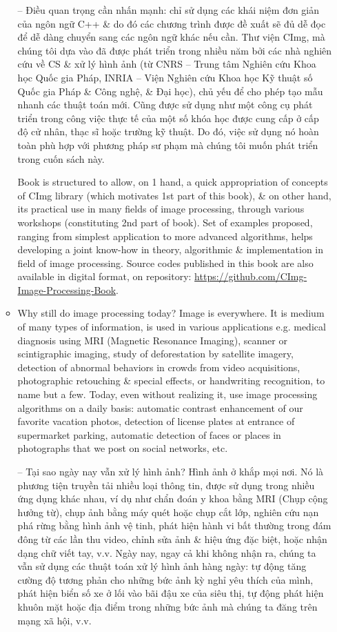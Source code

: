 \documentclass{article}
\begin{document}
\begin{itemize}
\begin{itemize}
        -- Điều quan trọng cần nhấn mạnh: chỉ sử dụng các khái niệm đơn giản của ngôn ngữ C++ \& do đó các chương trình được đề xuất sẽ đủ dễ đọc để dễ dàng chuyển sang các ngôn ngữ khác nếu cần. Thư viện CImg, mà chúng tôi dựa vào đã được phát triển trong nhiều năm bởi các nhà nghiên cứu về CS \& xử lý hình ảnh (từ CNRS -- Trung tâm Nghiên cứu Khoa học Quốc gia Pháp, INRIA -- Viện Nghiên cứu Khoa học Kỹ thuật số Quốc gia Pháp \& Công nghệ, \& Đại học), chủ yếu để cho phép tạo mẫu nhanh các thuật toán mới. Cũng được sử dụng như một công cụ phát triển trong công việc thực tế của một số khóa học được cung cấp ở cấp độ cử nhân, thạc sĩ hoặc trường kỹ thuật. Do đó, việc sử dụng nó hoàn toàn phù hợp với phương pháp sư phạm mà chúng tôi muốn phát triển trong cuốn sách này.
        
        Book is structured to allow, on 1 hand, a quick appropriation of concepts of CImg library (which motivates 1st part of this book), \& on other hand, its practical use in many fields of image processing, through various workshops (constituting 2nd part of book). Set of examples proposed, ranging from simplest application to more advanced algorithms, helps developing a joint know-how in theory, algorithmic \& implementation in field of image processing. Source codes published in this book are also available in digital format, on repository: \url{https://github.com/CImg-Image-Processing-Book}.
        \item {\sf Why still do image processing today?} Image is everywhere. It is medium of many types of information, is used in various applications e.g. medical diagnosis using MRI (Magnetic Resonance Imaging), scanner or scintigraphic imaging, study of deforestation by satellite imagery, detection of abnormal behaviors in crowds from video acquisitions, photographic retouching \& special effects, or handwriting recognition, to name but a few. Today, even without realizing it, use image processing algorithms on a daily basis: automatic contrast enhancement of our favorite vacation photos, detection of license plates at entrance of supermarket parking, automatic detection of faces or places in photographs that we post on social networks, etc.
        
        -- {\sf Tại sao ngày nay vẫn xử lý hình ảnh?} Hình ảnh ở khắp mọi nơi. Nó là phương tiện truyền tải nhiều loại thông tin, được sử dụng trong nhiều ứng dụng khác nhau, ví dụ như chẩn đoán y khoa bằng MRI (Chụp cộng hưởng từ), chụp ảnh bằng máy quét hoặc chụp cắt lớp, nghiên cứu nạn phá rừng bằng hình ảnh vệ tinh, phát hiện hành vi bất thường trong đám đông từ các lần thu video, chỉnh sửa ảnh \& hiệu ứng đặc biệt, hoặc nhận dạng chữ viết tay, v.v. Ngày nay, ngay cả khi không nhận ra, chúng ta vẫn sử dụng các thuật toán xử lý hình ảnh hàng ngày: tự động tăng cường độ tương phản cho những bức ảnh kỳ nghỉ yêu thích của mình, phát hiện biển số xe ở lối vào bãi đậu xe của siêu thị, tự động phát hiện khuôn mặt hoặc địa điểm trong những bức ảnh mà chúng ta đăng trên mạng xã hội, v.v.
        

\end{itemize}
\end{itemize}
\end{document}

